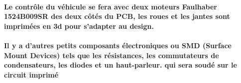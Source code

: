 \paragraph{
   Le contrôle du véhicule se fera avec deux moteurs Faulhaber 1524B009SR des deux côtés du
PCB, les roues et les jantes sont imprimées en 3d pour s'adapter au design.
}

\paragraph{
   Il y a d'autres petits composants électroniques ou SMD (Surface Mount Devices) tels que les
résistances, les commutateurs de condensateurs, les diodes et un haut-parleur. qui sera soudé
sur le circuit imprimé
}
